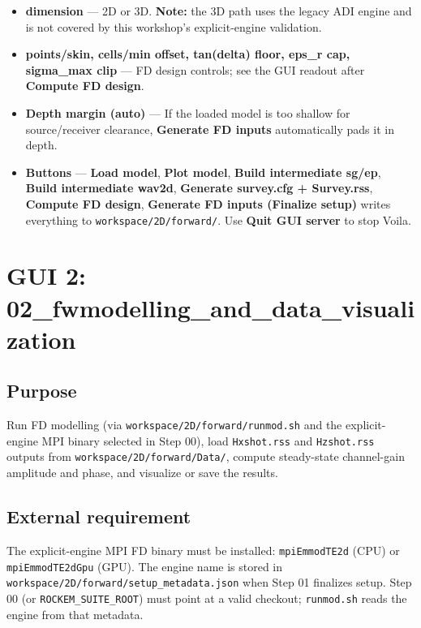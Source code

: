 \documentclass[11pt,a4paper]{article}
\begin{document}
\begin{itemize}
  \item \textbf{dimension} — 2D or 3D. \textbf{Note:} the 3D path uses the legacy ADI engine and is not covered by this workshop's explicit-engine validation.

  \item \textbf{points/skin, cells/min offset, tan(delta) floor, eps\_r cap, sigma\_max clip} — FD design controls; see the GUI readout after \textbf{Compute FD design}.

  \item \textbf{Depth margin (auto)} — If the loaded model is too shallow for source/receiver clearance, \textbf{Generate FD inputs} automatically pads it in depth.

  \item \textbf{Buttons} — \textbf{Load model}, \textbf{Plot model}, \textbf{Build intermediate sg/ep}, \textbf{Build intermediate wav2d}, \textbf{Generate survey.cfg + Survey.rss}, \textbf{Compute FD design}, \textbf{Generate FD inputs (Finalize setup)} writes everything to \texttt{workspace/2D/forward/}. Use \textbf{Quit GUI server} to stop Voila.

\end{itemize}

\section{GUI 2: 02\_fwmodelling\_and\_data\_visualization}

\subsection{Purpose}

Run FD modelling (via \texttt{workspace/2D/forward/runmod.sh} and the explicit-engine MPI binary selected in Step 00), load \texttt{Hxshot.rss} and \texttt{Hzshot.rss} outputs from \texttt{workspace/2D/forward/Data/}, compute steady-state channel-gain amplitude and phase, and visualize or save the results.

\subsection{External requirement}

The explicit-engine MPI FD binary must be installed: \texttt{mpiEmmodTE2d} (CPU) or \texttt{mpiEmmodTE2dGpu} (GPU). The engine name is stored in \texttt{workspace/2D/forward/setup\_metadata.json} when Step 01 finalizes setup. Step 00 (or \texttt{ROCKEM\_SUITE\_ROOT}) must point at a valid checkout; \texttt{runmod.sh} reads the engine from that metadata.
\end{document}
